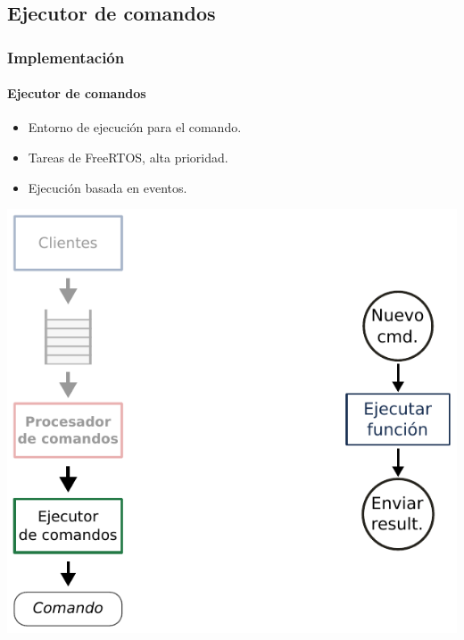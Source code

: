 \documentclass[xcolor=dvipsnames]{beamer}
\begin{document}
    \subsection{Ejecutor de comandos}
    \begin{frame}
        \frametitle{Implementación}
        \framesubtitle{Ejecutor de comandos}
        
        \begin{itemize}
            \item Entorno de ejecución para el comando.
            \item Tareas de FreeRTOS, alta prioridad.
            \item Ejecución basada en eventos.
        \end{itemize}
        
        \begin{center}
            \includegraphics[height=0.75\textheight]{img/implementacion_executer.pdf}
        \end{center}
        
    \end{frame}
    
    \begin{frame}
        \centering \Large {}
        
    \end{frame}
    
\end{document}
